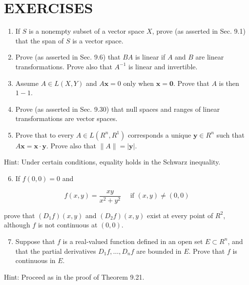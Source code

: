 \documentclass[10pt]{article}
\begin{document}
\section{EXERCISES}
\begin{enumerate}
  \item If $S$ is a nonempty subset of a vector space $X$, prove (as asserted in Sec. 9.1) that the span of $S$ is a vector space.

  \item Prove (as asserted in Sec. 9.6) that $B A$ is linear if $A$ and $B$ are linear transformations. Prove also that $A^{-1}$ is linear and invertible.

  \item Assume $A \in L(X, Y)$ and $A \mathbf{x}=0$ only when $\mathbf{x}=\mathbf{0}$. Prove that $A$ is then $1-1$.

  \item Prove (as asserted in Sec. 9.30) that null spaces and ranges of linear transformations are vector spaces.

  \item Prove that to every $A \in L\left(R^{n}, R^{1}\right)$ corresponds a unique $\mathbf{y} \in R^{n}$ such that $A \mathbf{x}=\mathbf{x} \cdot \mathbf{y}$. Prove also that $\|A\|=|\mathbf{y}|$.

\end{enumerate}

Hint: Under certain conditions, equality holds in the Schwarz inequality.

\begin{enumerate}
  \setcounter{enumi}{5}
  \item If $f(0,0)=0$ and
\end{enumerate}

$$
f(x, y)=\frac{x y}{x^{2}+y^{2}} \quad \text { if }(x, y) \neq(0,0)
$$

prove that $\left(D_{1} f\right)(x, y)$ and $\left(D_{2} f\right)(x, y)$ exist at every point of $R^{2}$, although $f$ is not continuous at $(0,0)$.

\begin{enumerate}
  \setcounter{enumi}{6}
  \item Suppose that $f$ is a real-valued function defined in an open set $E \subset R^{n}$, and that the partial derivatives $D_{1} f, \ldots, D_{n} f$ are bounded in $E$. Prove that $f$ is continuous in $E$.
\end{enumerate}

Hint: Proceed as in the proof of Theorem 9.21.
\end{document}
